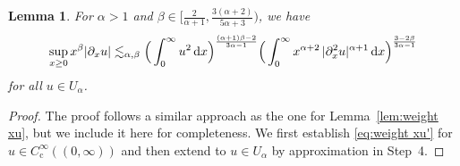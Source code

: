 \documentclass[reqno,12pt]{amsart}
\renewcommand{\d}{\ensuremath{\mathrm{d}}}
\renewcommand{\d}{\ensuremath{{\rm d}}}
\newtheorem{lemma}[theorem]{Lemma}
\numberwithin{equation}{section}
\begin{document}
%
\begin{lemma}\label{lem:weight xu'}
%
For \(\alpha >1\) and \(\beta \in \big[\frac{2}{\alpha +1}, \frac{3(\alpha+2)}{5\alpha +3}\big)\), we have
%
\begin{equation}\label{eq:weight xu'}
\sup_{x \ge 0} x^\beta |\partial_x u| \lesssim_{\alpha,\beta} \Big(\int_0^\infty u^2 \, \d x\Big)^{\frac{(\alpha +1)\beta -2}{3\alpha -1}} \Big(\int_0^\infty x^{\alpha+2} \, |\partial_x^2 u|^{\alpha+1} \, \d x\Big)^{\frac{3-2\beta}{3\alpha -1}}
\end{equation}
%
for all  $u \in U_\alpha$.
%
\end{lemma}
%
\begin{proof}
%
The proof follows a similar approach as the one for Lemma~\ref{lem:weight xu}, but we include it here for completeness. We first establish \eqref{eq:weight xu'} for $u \in C^\infty_\mathrm{c}((0,\infty))$ and then extend to $u \in U_\alpha$ by approximation in Step~4.

%
\bigskip 
%


\end{proof}
\end{document}
